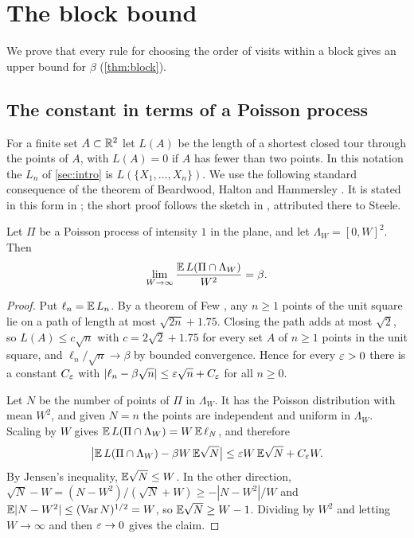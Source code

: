 \section{The block bound}\label{sec:blocks}

We prove that every rule for choosing the order of visits within a block gives an upper bound for $\beta$ (\cref{thm:block}).

\subsection{The constant in terms of a Poisson process}

For a finite set $A\subset\mathbb{R}^2$ let $L(A)$ be the length of a shortest closed tour through the points of $A$, with $L(A)=0$ if $A$ has fewer than two points. In this notation the $L_n$ of \cref{sec:intro} is $L(\{X_1,\dots,X_n\})$. We use the following standard consequence of the theorem of Beardwood, Halton and Hammersley \cite{BeardwoodHaltonHammersley1959,Steele1997}. It is stated in this form in \cite[equation~(5)]{DongCao2026}; the short proof follows the sketch in \cite[Section~2.1]{Steinerberger2015}, attributed there to Steele.

\begin{lem}\label{lem:poisson}
Let $\Pi$ be a Poisson process of intensity $1$ in the plane, and let $\Lambda_W=[0,W]^2$. Then
\[
\lim_{W\to\infty}\frac{\mathbb{E}\,L(\Pi\cap \Lambda_W)}{W^2}=\beta .
\]
\end{lem}

\begin{proof}
Put $\ell_n=\mathbb{E}\,L_n$. By a theorem of Few \cite{Few1955}, any $n\ge1$ points of the unit square lie on a path of length at most $\sqrt{2n}+1.75$. Closing the path adds at most $\sqrt2$, so $L(A)\le c\sqrt n$ with $c=2\sqrt2+1.75$ for every set $A$ of $n\ge1$ points in the unit square, and $\ell_n/\sqrt n\to\beta$ by bounded convergence. Hence for every $\varepsilon>0$ there is a constant $C_\varepsilon$ with $|\ell_n-\beta\sqrt n|\le\varepsilon\sqrt n+C_\varepsilon$ for all $n\ge0$.

Let $N$ be the number of points of $\Pi$ in $\Lambda_W$. It has the Poisson distribution with mean $W^2$, and given $N=n$ the points are independent and uniform in $\Lambda_W$. Scaling by $W$ gives $\mathbb{E}\,L(\Pi\cap \Lambda_W)=W\,\mathbb{E}\,\ell_N$, and therefore
\[
\bigl|\mathbb{E}\,L(\Pi\cap \Lambda_W)-\beta W\,\mathbb{E}\sqrt N\bigr|\le \varepsilon W\,\mathbb{E}\sqrt N+C_\varepsilon W .
\]
By Jensen's inequality, $\mathbb{E}\sqrt N\le W$. In the other direction, $\sqrt N-W=(N-W^2)/(\sqrt N+W)\ge-|N-W^2|/W$ and $\mathbb{E}|N-W^2|\le(\operatorname{Var}N)^{1/2}=W$, so $\mathbb{E}\sqrt N\ge W-1$. Dividing by $W^2$ and letting $W\to\infty$ and then $\varepsilon\to0$ gives the claim.
\end{proof}

